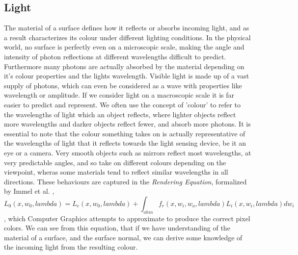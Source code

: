 \documentclass[ %
                    author={Gavin Parker},
                supervisor={Dr. Neill Campbell},
                    degree={MEng},
                     title={Deep Siamese Networks for Illumination Estimation from Stereo Images},
                  subtitle={},
                      type={research},
                      year={2018} ]{dissertation}
\begin{document}
\subsection{Light}
The material of a surface defines how it reflects or absorbs incoming light, and as a result characterizes its colour under different lighting conditions. In the physical world, no surface is perfectly even on a microscopic scale, making the angle and intensity of photon reflections at different wavelengths difficult to predict. Furthermore many photons are actually absorbed by the material depending on it's colour properties and the lights wavelength. Visible light is made up of a vast supply of photons, which can even be considered as a wave with properties like wavelength or amplitude. If we consider light on a macroscopic scale it is far easier to predict and represent. We often use the concept of 'colour' to refer to the wavelengths of light which an object reflects, where lighter objects reflect more wavelengths and darker objects reflect fewer, and absorb more photons. It is essential to note that the colour something takes on is actually representative of the wavelengths of light that it reflects towards the light sensing device, be it an eye or a camera. Very smooth objects such as mirrors reflect most wavelengths, at very predictable angles, and so take on different colours depending on the viewpoint, wheras some materials tend to reflect similar wavelengths in all directions. These behaviours are captured in the \textit{Rendering Equation}, formalized by Immel et al. \cite{Immel:1986:RMN:15886.15901},
\[L_0(x, w_0, lambda) = L_e(x, w_0, lambda) + \int_{ohm}{f_r(x, w_i, w_o,lambda)L_i(x, w_i, lambda)dw_i}\],
which Computer Graphics attempts to approximate to produce the correct pixel colors. We can see from this equation, that if we have understanding of the material of a surface, and the surface normal, we can derive some knowledge of the incoming light from the resulting colour.
\end{document}
